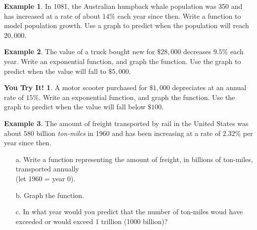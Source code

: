 \documentclass{report}
\theoremstyle{definition}
\newtheorem{example}{\bf Example}
\newtheorem{youtry}{\bf You Try It!}
\begin{document}
\vspace{1cm}

\begin{example}
In 1081, the Australian humpback whale population was 350 and has increased at a rate of about $14\%$ each year since then. Write a function to model population growth. Use a graph to predict when the population will reach $20,000$.
\end{example}
\vfill

\begin{example}
The value of a truck bought new for $\$28,000$ decreases $9.5\%$ each year. Write an exponential function, and graph the function. Use the graph to predict when the value will fall to $\$5,000$.
\end{example}
\vfill

\begin{youtry}
A motor scooter purchased for $\$1,000$ depreciates at an annual rate of $15\%$. Write an exponential function, and graph the function. Use the graph to predict when the value will fall below $\$100$.
\end{youtry}
\vfill

 \newpage

\begin{example}
The amount of freight transported by rail in the United States was about 580 billion \emph{ton-miles} in 1960 and has been increasing at a rate of $2.32\%$ per year since then.
\end{example}
\begin{itemize}
\item[a.] Write a function representing the amount of freight, in billions of ton-miles, transported annually\\ (let 1960 = year 0).
\vspace{1.5cm}
\item[b.] Graph the function.
\vspace{1.5cm}
\item[c.] In what year would you predict that the number of ton-miles woud have exceeded or would exceed 1 trillion (1000 billion)?
\end{itemize}
\vfill
\end{document}
